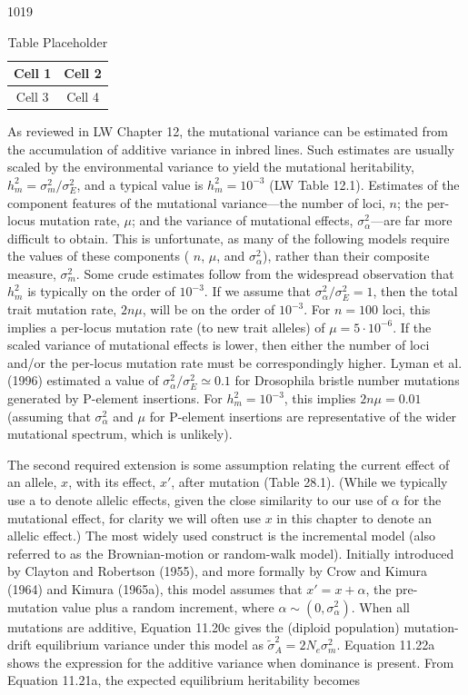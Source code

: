 \documentclass{article}
\begin{document}
1019

\begin{table}[h]
\centering
\begin{tabular}{|c|c|}
\hline
Cell 1 & Cell 2 \\
\hline
Cell 3 & Cell 4 \\
\hline
\end{tabular}
\caption{Table Placeholder}
\end{table}

As reviewed in LW Chapter 12, the mutational variance can be estimated from the accumulation of additive variance in inbred lines. Such estimates are usually scaled by the environmental variance to yield the mutational heritability,  $ h_m^2 = \sigma_m^2 / \sigma_E^2 $, and a typical value is  $ h_m^2 = 10^{-3} $ (LW Table 12.1). Estimates of the component features of the mutational variance—the number of loci,  $ n $; the per-locus mutation rate,  $ \mu $; and the variance of mutational effects,  $ \sigma_\alpha^2 $—are far more difficult to obtain. This is unfortunate, as many of the following models require the values of these components ( $ n $,  $ \mu $, and  $ \sigma_\alpha^2 $), rather than their composite measure,  $ \sigma_m^2 $. Some crude estimates follow from the widespread observation that  $ h_m^2 $ is typically on the order of  $ 10^{-3} $. If we assume that  $ \sigma_\alpha^2 / \sigma_E^2 = 1 $, then the total trait mutation rate,  $ 2n\mu $, will be on the order of  $ 10^{-3} $. For  $ n = 100 $ loci, this implies a per-locus mutation rate (to new trait alleles) of  $ \mu = 5 \cdot 10^{-6} $. If the scaled variance of mutational effects is lower, then either the number of loci and/or the per-locus mutation rate must be correspondingly higher. Lyman et al. (1996) estimated a value of  $ \sigma_\alpha^2 / \sigma_E^2 \simeq 0.1 $ for Drosophila bristle number mutations generated by P-element insertions. For  $ h_m^2 = 10^{-3} $, this implies  $ 2n\mu = 0.01 $ (assuming that  $ \sigma_\alpha^2 $ and  $ \mu $ for P-element insertions are representative of the wider mutational spectrum, which is unlikely).

The second required extension is some assumption relating the current effect of an allele,  $ x $, with its effect,  $ x' $, after mutation (Table 28.1). (While we typically use a to denote allelic effects, given the close similarity to our use of  $ \alpha $ for the mutational effect, for clarity we will often use  $ x $ in this chapter to denote an allelic effect.) The most widely used construct is the incremental model (also referred to as the Brownian-motion or random-walk model). Initially introduced by Clayton and Robertson (1955), and more formally by Crow and Kimura (1964) and Kimura (1965a), this model assumes that  $ x' = x + \alpha $, the pre-mutation value plus a random increment, where  $ \alpha \sim (0, \sigma_{\alpha}^2) $. When all mutations are additive, Equation 11.20c gives the (diploid population) mutation-drift equilibrium variance under this model as  $ \tilde{\sigma}_A^2 = 2N_e \sigma_m^2 $. Equation 11.22a shows the expression for the additive variance when dominance is present. From Equation 11.21a, the expected equilibrium heritability becomes
\end{document}
